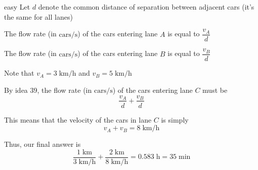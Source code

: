 \begin{solution}{easy}
Let $d$ denote the common distance of separation between adjacent cars (it's the same for all lanes) \vspace{3mm}

The flow rate (in $\text{cars/s}$) of the cars entering lane $A$ is equal to $\dfrac{v_A}{d}$ \vspace{3mm}

The flow rate (in $\text{cars/s}$) of the cars entering lane $B$ is equal to $\dfrac{v_B}{d}$ \vspace{3mm}

Note that $v_A=3\;\text{km/h}$ and $v_B=5\;\text{km/h}$ \vspace{3mm}

By idea 39, the flow rate (in $\text{cars/s}$) of the cars entering lane $C$ must be $$\dfrac{v_A}{d}+\dfrac{v_B}{d}$$

This means that the velocity of the cars in lane $C$ is simply $$v_A+v_B=8\;\text{km/h}$$

Thus, our final answer is $$\dfrac{1\;\text{km}}{3\;\text{km/h}}+\dfrac{2\;\text{km}}{8\;\text{km/h}}=0.583\;\text{h}=\boxed{35\;\text{min}}$$
\end{solution}